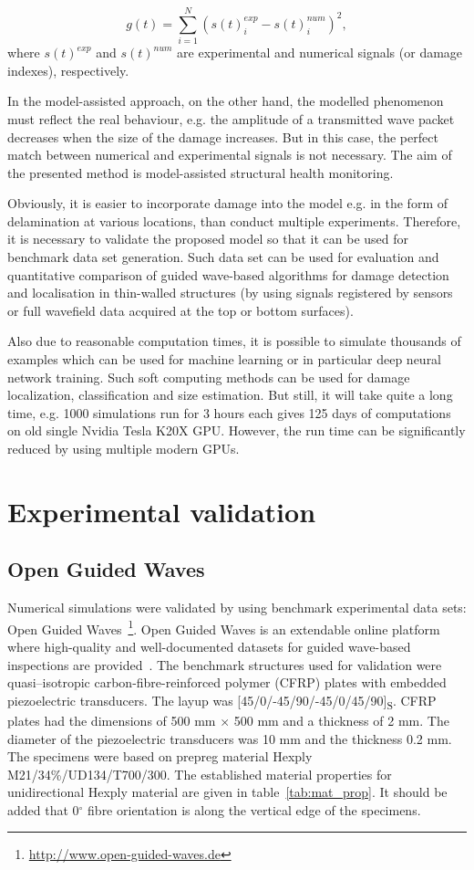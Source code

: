 \begin{equation}
g(t) = \sum_{i=1}^{N} \left(s(t)_i^{exp} - s(t)_i^{num}\right)^2,\label{eq:obj_fun}
\end{equation}
where \(s(t)^{exp}\) and \(s(t)^{num}\) are experimental and numerical signals (or damage indexes), respectively.

In the model-assisted approach, on the other hand, the modelled phenomenon must reflect the real behaviour, e.g. the amplitude of a transmitted wave packet decreases when the size of the damage increases. But in this case, the perfect match between numerical and experimental signals is not necessary. The aim of the presented method is model-assisted structural health monitoring.

Obviously, it is easier to incorporate damage into the model e.g. in the form of delamination at various locations, than conduct multiple experiments. Therefore, it is necessary to validate the proposed model so that it can be used for benchmark data set generation. Such data set can be used for evaluation and quantitative comparison of guided wave-based algorithms for damage detection and localisation in thin-walled structures (by using signals registered by sensors or full wavefield data acquired at the top or bottom surfaces).

Also due to reasonable computation times, it is possible to simulate thousands of examples which can be used for machine learning or in particular deep neural network training. Such soft computing methods can be used for damage localization, classification and size estimation. But still, it will take quite a long time, e.g. 1000 simulations run for 3 hours each gives 125 days of computations on old single Nvidia Tesla K20X GPU. However, the run time can be significantly reduced by using multiple modern GPUs.


\section{Experimental validation}

\subsection{Open Guided Waves \label{sec:ogw}}
Numerical simulations were validated by using benchmark experimental data sets: Open Guided Waves~\footnote{\url{http://www.open-guided-waves.de}}. Open Guided Waves is an extendable online platform where high-quality and well-documented datasets for guided wave-based inspections are provided~\cite{Moll2018}. The benchmark structures used for validation were quasi--isotropic carbon-fibre-reinforced polymer (CFRP) plates with embedded piezoelectric transducers. The layup was [45/0/-45/90/-45/0/45/90]\textsubscript{S}. CFRP plates had the dimensions of 500 mm \(\times\) 500 mm and a thickness of 2 mm. The diameter of the piezoelectric transducers was 10 mm and the thickness 0.2 mm. The specimens were based on prepreg material Hexply\textsuperscript{\textregistered} M21/34\%/UD134/T700/300. The established material properties for unidirectional Hexply material are given in table~\ref{tab:mat_prop}. It should be added that 0\(^{\circ}\) fibre orientation is along the vertical edge of the specimens.

